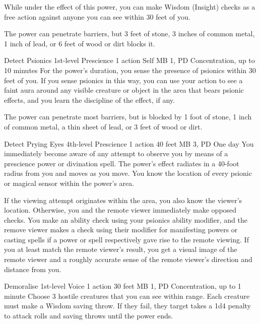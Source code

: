   While under the effect of this power,
  you can make Wisdom (Insight) checks as a free action
  against anyone you can see within 30 feet of you.
  
  The power can penetrate barriers,
  but 3 feet of stone,
  3 inches of common metal,
  1 inch of lead,
  or 6 feet of wood or dirt blocks it.

\DndPowerHeader%
  {Detect Psionics}
  {1st-level Prescience}
  {1 action}
  {Self}
  {MB 1, PD \lvlone}
  {Concentration, up to 10 minutes}
For the power's duration,
you sense the presence of psionics within 30 feet of you.
If you sense psionics in this way,
you can use your action to see a faint aura around
any visible creature or object in the area that bears psionic effects,
and you learn the discipline of the effect, if any.

The power can penetrate most barriers, but is blocked by
1 foot of stone,
1 inch of common metal,
a thin sheet of lead,
or 3 feet of wood or dirt.

\DndPowerHeader%
  {Detect Prying Eyes}
  {4th-level Prescience}
  {1 action}
  {40 feet}
  {MB 3, PD \lvlfour}
  {One day}
  You immediately become aware of any attempt to observe you
  by means of a prescience power or divination spell.
  The power's effect radiates in a 40-foot radius
  from you and moves as you move.
  You know the location of every psionic or magical sensor
  within the power's area.

  If the viewing attempt originates within the area,
  you also know the viewer's location.
  Otherwise, you and the remote viewer immediately make opposed checks.
  You make an ability check using your psionics ability modifier,
  and the remove viewer makes a check using their modifier
  for manifesting powers or casting spells if a power or spell
  respectively gave rise to the remote viewing.
  If you at least match the remote viewer's result,
  you get a visual image of the remote viewer
  and a roughly accurate sense of the remote viewer's
  direction and distance from you.

\DndPowerHeader%
  {Demoralise}
  {1st-level Voice}
  {1 action}
  {30 feet}
  {MB 1, PD \lvlone}
  {Concentration, up to 1 minute}
Choose 3 hostile creatures that you can see within range.
Each creature must make a Wisdom saving throw.
If they fail, they target takes a 1d4 penalty to attack rolls and
saving throws until the power ends.

